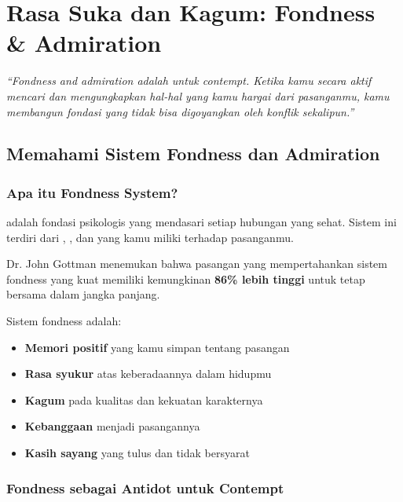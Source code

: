 \chapter{Rasa Suka dan Kagum: Fondness \& Admiration}

\begin{insightbox}
\textit{``Fondness and admiration adalah  untuk contempt. Ketika kamu secara aktif mencari dan mengungkapkan hal-hal yang kamu hargai dari pasanganmu, kamu membangun fondasi yang tidak bisa digoyangkan oleh konflik sekalipun.''}
\end{insightbox}

\section{Memahami Sistem Fondness dan Admiration}

\subsection{Apa itu Fondness System?}

 adalah fondasi psikologis yang mendasari setiap hubungan yang sehat. Sistem ini terdiri dari , , dan  yang kamu miliki terhadap pasanganmu.

Dr. John Gottman menemukan bahwa pasangan yang mempertahankan sistem fondness yang kuat memiliki kemungkinan \textbf{86\% lebih tinggi} untuk tetap bersama dalam jangka panjang.

\begin{praktikbox}
Sistem fondness adalah:
\begin{itemize}
    \item \textbf{Memori positif} yang kamu simpan tentang pasangan
    \item \textbf{Rasa syukur} atas keberadaannya dalam hidupmu
    \item \textbf{Kagum} pada kualitas dan kekuatan karakternya
    \item \textbf{Kebanggaan} menjadi pasangannya
    \item \textbf{Kasih sayang} yang tulus dan tidak bersyarat
\end{itemize}
\end{praktikbox}

\subsection{Fondness sebagai Antidot untuk Contempt}

